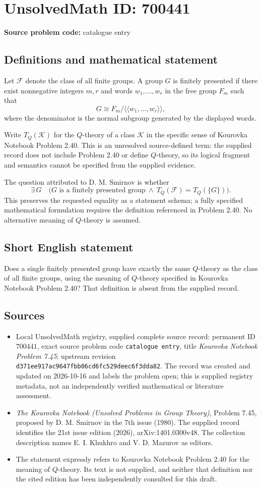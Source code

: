 \documentclass[11pt]{article}
\begin{document}
\section*{UnsolvedMath ID: 700441}
\textbf{Source problem code:} catalogue entry
\subsection{Definitions and mathematical statement}
Let \(\mathcal F\) denote the class of all finite groups. A group \(G\) is finitely presented if there exist nonnegative integers \(m,r\) and words \(w_1,\ldots,w_r\) in the free group \(F_m\) such that
\[
G\cong F_m/\langle\!\langle w_1,\ldots,w_r\rangle\!\rangle,
\]
where the denominator is the normal subgroup generated by the displayed words.

Write \(T_Q(\mathcal K)\) for the \(Q\)-theory of a class \(\mathcal K\) in the specific sense of Kourovka Notebook Problem 2.40. This is an unresolved source-defined term: the supplied record does not include Problem 2.40 or define \(Q\)-theory, so its logical fragment and semantics cannot be specified from the supplied evidence.

The question attributed to D. M. Smirnov is whether
\[
\exists\,G\quad\bigl(G\text{ is a finitely presented group}\ \land\ T_Q(\mathcal F)=T_Q(\{G\})\bigr).
\]
This preserves the requested equality as a statement schema; a fully specified mathematical formulation requires the definition referenced in Problem 2.40. No alternative meaning of \(Q\)-theory is assumed.
\subsection{Short English statement}
Does a single finitely presented group have exactly the same \(Q\)-theory as the class of all finite groups, using the meaning of \(Q\)-theory specified in Kourovka Notebook Problem 2.40? That definition is absent from the supplied record.
\subsection{Sources}
\begin{itemize}
\item Local UnsolvedMath registry, supplied complete source record: permanent ID \(700441\), exact source problem code \texttt{catalogue entry}, title \emph{Kourovka Notebook Problem 7.45}; upstream revision \texttt{d371ee917ac9647fbb06cd6fc529deec6f3dda82}. The record was created and updated on 2026-10-16 and labels the problem open; this is supplied registry metadata, not an independently verified mathematical or literature assessment.
\item \emph{The Kourovka Notebook (Unsolved Problems in Group Theory)}, Problem 7.45, proposed by D. M. Smirnov in the 7th issue (1980). The supplied record identifies the 21st issue edition (2026), arXiv:1401.0300v48. The collection description names E. I. Khukhro and V. D. Mazurov as editors.
\item The statement expressly refers to Kourovka Notebook Problem 2.40 for the meaning of \(Q\)-theory. Its text is not supplied, and neither that definition nor the cited edition has been independently consulted for this draft.
\end{itemize}
\end{document}

